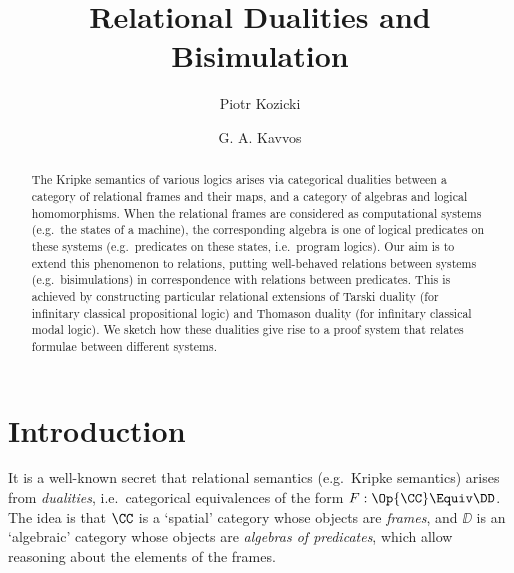 \documentclass[a4paper,UKenglish,cleveref, autoref]{lipics-v2021}
\title{Relational Dualities and Bisimulation}
\author{Piotr Kozicki}{University of Bristol, United Kingdom}{piotr.kozicki@bristol.ac.uk}{https://orcid.org/0009-0003-5730-6895}{}
\author{G. A. Kavvos}{University of Bristol, United Kingdom}{alex.kavvos@bristol.ac.uk}{https://orcid.org/0000-0001-7953-7975}{}
\begin{document}
\maketitle

\begin{abstract}
  The Kripke semantics of various logics arises via categorical
  dualities between a category of relational frames and their maps,
  and a category of algebras and logical homomorphisms. When the
  relational frames are considered as computational systems (e.g.\ the
  states of a machine), the corresponding algebra is one of logical
  predicates on these systems (e.g.\ predicates on these states, i.e.\
  program logics). Our aim is to extend this phenomenon to relations,
  putting well-behaved relations between systems (e.g.\ bisimulations)
  in correspondence with relations between predicates. This is
  achieved by constructing particular relational extensions of Tarski
  duality (for infinitary classical propositional logic) and Thomason
  duality (for infinitary classical modal logic). We sketch how these
  dualities give rise to a proof system that relates formulae between
  different systems.
\end{abstract}

\section{Introduction}\label{section:introduction}

It is a well-known secret that relational semantics (e.g.\ Kripke semantics)
arises from \emph{dualities}, i.e.\ categorical equivalences of the form $F :
\Op{\CC} \Equiv \DD$. The idea is that $\CC$ is a `spatial' category whose
objects are \emph{frames}, and $\DD$ is an `algebraic' category whose objects
are \emph{algebras of predicates}, which allow reasoning about the elements of
the frames.
\end{document}
